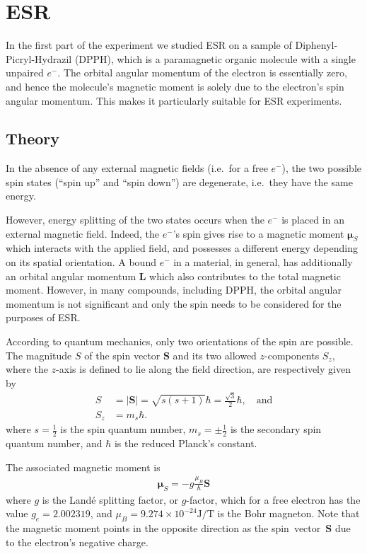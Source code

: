 \documentclass[a4paper]{jpconf}
\numberwithin{equation}{section}
\begin{document}
\section{ESR}
In the first part of the experiment we studied ESR on a sample of Diphenyl-Picryl-Hydrazil (DPPH), which is a paramagnetic organic molecule with a single unpaired $e^-$. The orbital angular momentum of the electron is essentially zero,    %
and hence the molecule\textquoteright s magnetic moment is solely due to the electron\textquoteright s spin angular momentum. This makes it particularly suitable for ESR experiments.
 
\subsection{Theory}
In the absence of any external magnetic fields (i.e.\ for a free $e^-$), the two possible spin states (``spin up'' and ``spin down'') are degenerate, i.e.\ they have the same energy.

However, energy splitting of the two states occurs when the $e^-$ is placed in an external magnetic field. Indeed, the $e^-$'s spin gives rise to a magnetic moment $\bm{\mu}_S$ which interacts with the applied field, and possesses a different energy depending on its spatial orientation. A bound $e^-$ in a material, in general, has additionally an orbital angular momentum $\mathbf{L}$ which also contributes to the total magnetic moment. However, in many compounds, including DPPH, the orbital angular momentum is not significant and only the spin needs to be considered for the purposes of ESR. 

According to quantum mechanics, only two orientations of the spin are possible. The magnitude $S$ of the spin vector $\mathbf{S}$ and its two allowed $z$-components $S_z$, where the $z$-axis is defined to lie along the field direction, are respectively given by
\begin{align}
	S &= \lvert\mathbf{S}\rvert = \sqrt{s(s+1)}\hbar = \tfrac{\sqrt{3}}{2}\hbar,  \quad \text{and} \nonumber \\
	S_z &= m_s \hbar. \label{eqn: magnetic moment z-projection}
\end{align}
where $s=\tfrac12$ is the spin quantum number, $m_s=\pm\tfrac12$ is the secondary spin quantum number, and $\hbar$ is the reduced Planck\textquoteright s constant.

The associated magnetic moment is
\begin{align}
	\bm{\mu}_S = - g \frac{\mu_B}{\hbar} \mathbf{S} \label{eqn: magnetic moment}
\end{align}
where $g$ is the Land\'e splitting factor, or $g$-factor, which for a free electron has the value $g_e = 2.002319$, and $\mu_B = 9.274 \times 10^{-24} \si{\joule\per\tesla}$ is the Bohr magneton. Note that the magnetic moment points in the opposite direction as the spin~vector~$\mathbf{S}$ due to the electron's negative charge.
\end{document}

